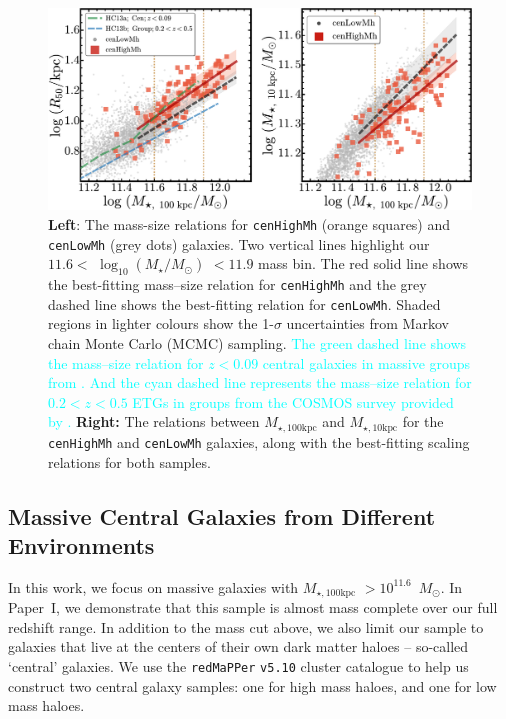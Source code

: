 \documentclass[a4paper,fleqn,usenatbib]{mnras}
\def\msun{$M_\odot$}
\def\redm{\texttt{redMaPPer}}
\def\rbcg{\texttt{cenHighMh}}
\def\nbcg{\texttt{cenLowMh}}
\def\logms{{$\log_{10} (M_{\star}/M_{\odot})$}}
\def\minn{{$M_{\star,10\mathrm{kpc}}$}}
\def\mtot{{$M_{\star,100\mathrm{kpc}}$}}
\newcommand{\song}[1]{\textcolor{cyan}{#1}}
\begin{document}
  \begin{figure}
      \centering 
      \includegraphics[width=\textwidth]{fig/redbcg_scaling_relation}
      \caption{
          \textbf{Left}: The mass-size relations for \rbcg{} (orange squares) and 
          \nbcg{} (grey dots) galaxies. 
          Two vertical lines highlight our $11.6<$ \logms{} $<11.9$ mass bin. 
          The red solid line shows the best-fitting mass--size relation for \rbcg{} and the 
          grey dashed line shows the best-fitting relation for \nbcg{}. 
          Shaded regions in lighter colours show the 1-$\sigma$ uncertainties
          from Markov chain Monte Carlo (MCMC) sampling.  
          \song{
          The green dashed line shows the mass--size relation for $z<0.09$ central 
          galaxies in massive groups from \citet{HCompany13}. 
          And the cyan dashed line represents the mass--size relation for 
          $0.2<z<0.5$ ETGs in groups from the COSMOS survey provided by 
          \citet{HueartasCompany2013b}.
          }
          \textbf{Right:} The relations between \mtot{} and \minn{} for the 
          \rbcg{} and \nbcg{} galaxies, along with the best-fitting scaling relations for 
          both samples.
          }
      \label{fig:scaling_relation} 
  \end{figure}

 
\subsection{Massive Central Galaxies from Different Environments}
    \label{ssec:cen}
         
    In this work, we focus on massive galaxies with \mtot{} $>10^{11.6}$~\msun{}. 
    In Paper~I, we demonstrate that this sample is almost mass complete over our full 
    redshift range. 
    In addition to the mass cut above, we also limit our sample to galaxies that live 
    at the centers of their own dark matter haloes -- so-called `central' galaxies. 
    We use the \redm{} \texttt{v5.10} \citep{Rykoff2014, Rozo2015b} cluster catalogue 
    to help us construct two central galaxy samples: one for high mass haloes, and 
    one for low mass haloes.
    
\end{document}
